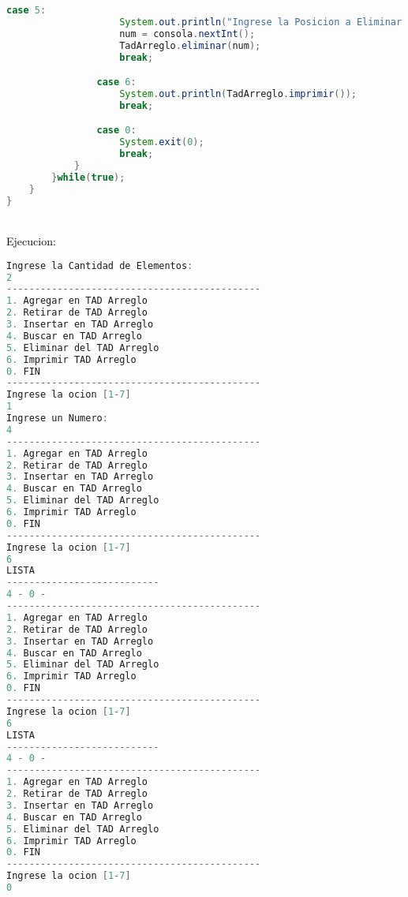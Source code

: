 \documentclass{article}
\begin{document}
\begin{itemize}
\begin{itemize}
\begin{lstlisting}[language=java]
                case 5:
                    System.out.println("Ingrese la Posicion a Eliminar: ");
                    num = consola.nextInt();
                    TadArreglo.eliminar(num);
                    break;

                case 6:
                    System.out.println(TadArreglo.imprimir());
                    break;

                case 0:
                    System.exit(0);
                    break;
            }
        }while(true);
    }
}

        \end{lstlisting}
        \newline
        \\
        \textcolor{black}{Ejecucion:} 
		\begin{lstlisting}[language=java]
Ingrese la Cantidad de Elementos:
2
---------------------------------------------
1. Agregar en TAD Arreglo
2. Retirar de TAD Arreglo
3. Insertar en TAD Arreglo
4. Buscar en TAD Arreglo
5. Eliminar del TAD Arreglo
6. Imprimir TAD Arreglo
0. FIN
---------------------------------------------
Ingrese la ocion [1-7]
1
Ingrese un Numero:
4
---------------------------------------------
1. Agregar en TAD Arreglo
2. Retirar de TAD Arreglo
3. Insertar en TAD Arreglo
4. Buscar en TAD Arreglo
5. Eliminar del TAD Arreglo
6. Imprimir TAD Arreglo
0. FIN
---------------------------------------------
Ingrese la ocion [1-7]
6
LISTA
---------------------------
4 - 0 -
---------------------------------------------
1. Agregar en TAD Arreglo
2. Retirar de TAD Arreglo
3. Insertar en TAD Arreglo
4. Buscar en TAD Arreglo
5. Eliminar del TAD Arreglo
6. Imprimir TAD Arreglo
0. FIN
---------------------------------------------
Ingrese la ocion [1-7]
6
LISTA
---------------------------
4 - 0 -
---------------------------------------------
1. Agregar en TAD Arreglo
2. Retirar de TAD Arreglo
3. Insertar en TAD Arreglo
4. Buscar en TAD Arreglo
5. Eliminar del TAD Arreglo
6. Imprimir TAD Arreglo
0. FIN
---------------------------------------------
Ingrese la ocion [1-7]
0
        \end{lstlisting}
        
	\end{itemize}
    

\end{itemize}
\end{document}
